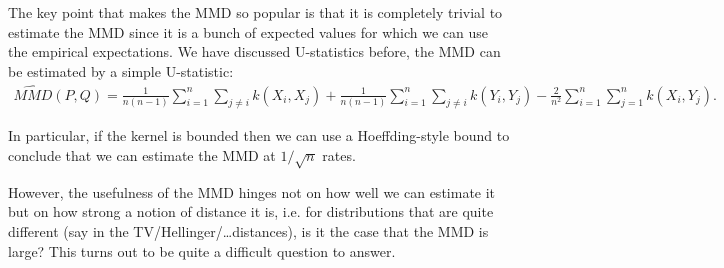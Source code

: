 \documentclass[twoside,12pt]{article}
\begin{document}
The key point that makes the MMD so popular is that it is completely trivial to estimate the MMD since it is a bunch of expected values for which we can use the empirical expectations. We have discussed U-statistics before, the MMD can be estimated by a simple U-statistic:
\begin{align*}
\widehat{MMD}(P,Q) = \frac{1}{n(n-1)} \sum_{i=1}^n \sum_{j \neq i} k(X_i,X_j) +  \frac{1}{n(n-1)} \sum_{i=1}^n \sum_{j \neq i} k(Y_i,Y_j) - \frac{2}{n^2} \sum_{i=1}^n \sum_{j=1}^n k(X_i,Y_j).
\end{align*}

In particular, if the kernel is bounded then we can use a Hoeffding-style bound to conclude that we can estimate the MMD at $1/\sqrt{n}$ rates.

However, the usefulness of the MMD hinges not on how well we can estimate it but on how strong a notion of distance it is, i.e. for distributions that are quite different (say in the TV/Hellinger/\ldots distances), is it the case that the MMD is large? This turns out to be quite a difficult question to answer.
\end{document}
